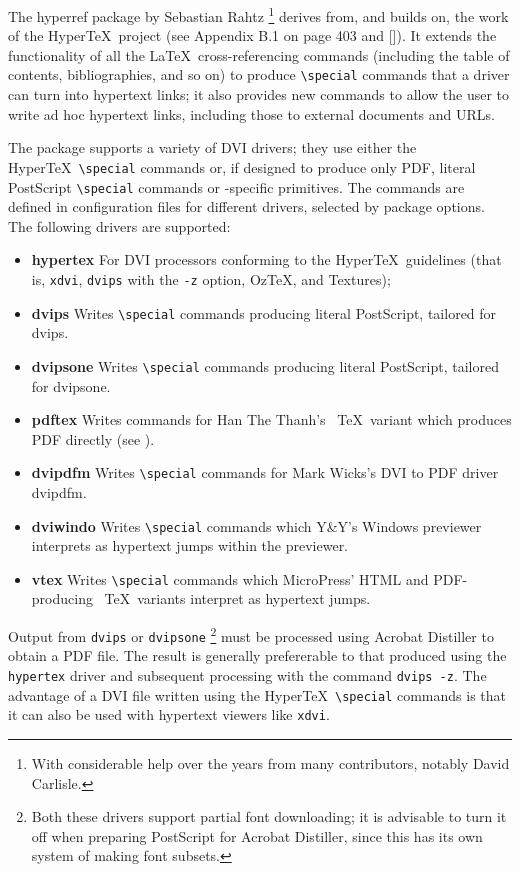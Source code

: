 

The hyperref package by Sebastian Rahtz \footnote{With considerable help
over the years from many contributors, notably David Carlisle. } derives
from, and builds on, the work of the Hyper\TeX\  project (see Appendix
B.1 on page 403 and []). It extends the functionality of all the \LaTeX\
cross-referencing commands (including the table of contents,
bibliographies, and so on) to produce \verb|\special| commands that a
driver can turn into hypertext links; it also provides new commands to
allow the user to write ad hoc hypertext links, including those to
external documents and URLs. 
 
The package supports a variety of DVI drivers; they use either the
Hyper\TeX\  \verb|\special| commands or, if designed to produce only
PDF, literal PostScript \verb|\special| commands or \pdfTEX-specific
primitives. The commands are defined in configuration files for
different drivers, selected by package options. The following drivers
are supported: 

\begin{itemize}
  \item \textbf{hypertex} For DVI processors conforming to the Hyper\TeX\  guidelines (that is, 
    \verb|xdvi|, \verb|dvips| with the \verb|-z| option, OzTeX, and Textures); 
  \item \textbf{dvips} Writes \verb|\special| commands producing literal PostScript, tailored for 
    dvips. 
  \item \textbf{dvipsone} Writes \verb|\special| commands producing literal PostScript, tailored for 
    dvipsone. 
  \item \textbf{pdftex} Writes commands for Han The Thanh's \ \TeX\  variant which produces PDF 
    directly (see \refsec{2_4_Generating_PDF_directly_from_TeX}). 
  \item \textbf{dvipdfm} Writes \verb|\special| commands for Mark Wicks's DVI to PDF driver 
    dvipdfm. 
  \item \textbf{dviwindo} Writes \verb|\special| commands which Y\&Y's Windows previewer interprets as hypertext jumps within the previewer. 
  \item \textbf{vtex} Writes \verb|\special| commands which MicroPress' HTML and PDF-producing 
    \ \TeX\  variants interpret as hypertext jumps. 
\end{itemize}

Output from \verb|dvips| or \verb|dvipsone| \footnote{
Both these drivers support partial font downloading; it is advisable to turn it off when preparing 
PostScript for Acrobat Distiller, since this has its own system of making font subsets. 
} must be processed using Acrobat Distiller to 
obtain a PDF file. The result is generally prefererable to that produced using the 
\verb|hypertex| driver and subsequent processing with the command \verb|dvips -z|. The 
advantage of a DVI file written using the Hyper\TeX\  \verb|\special| commands is that it 
can also be used with hypertext viewers like \verb|xdvi|. 

